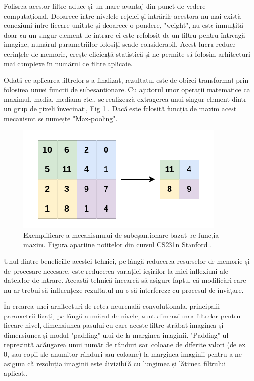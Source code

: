 \documentclass[a4paper,12pt]{book}
\begin{document}
				Folisrea acestor filtre aduce și un mare avantaj din punct de vedere computațional. Deoarece între nivelele rețelei și intrările acestora nu mai există conexiuni între fiecare unitate și deoarece o pondere, "weight", nu este înmulțită doar cu un singur element de intrare ci este refolosit de un filtru pentru întreagă imagine, numărul parametriilor folosiți scade considerabil. Acest lucru reduce cerințele de memorie, crește eficiență statistică și ne permite să folosim arhitecturi mai complexe în numărul de filtre aplicate. \par
				
				Odată ce aplicarea filtrelor s-a finalizat, rezultatul este de obicei transformat prin folosirea unuei funcții de subeșantionare. Cu ajutorul unor operații matematice ca maximul, media, mediana etc., se realizează extragerea unui singur element dintr-un grup de pixeli învecinați, Fig \ref{fig:maxpool} . Dacă este folosită funcția de maxim acest mecanismt se numește "Max-pooling".
				
				\begin{figure}[h]
					\centering
					\includegraphics[scale=0.25]{maxpool}
					\caption{Exemplificare a mecanismului de subeșantionare bazat pe funcția maxim. Figura aparține notitelor din cursul CS231n Stanford \cite{standord_cnn}.}
					\label{fig:maxpool}
				\end{figure}
				
				 \noindent Unul dintre beneficiile acestei tehnici, pe lângă reducerea resurselor de memorie și de procesare necesare, este reducerea variației ieșirilor la mici inflexiuni ale datelelor de intrare. Această tehnică încearcă să asigure faptul că modificări care nu ar trebui să influențeze rezultatul nu o să interfereze cu procesul de învățare. \par
				 
				 În crearea unei arhitecturi de rețea neuronală convolutionala, principalii parametrii fixați, pe lângă numărul de nivele, sunt dimensiunea filtrelor pentru fiecare nivel, dimensiunea pasului cu care aceste filtre străbat imaginea și dimensiunea și modul "padding"-ului de la marginea imaginii. "Padding"-ul reprezintă adăugarea unui număr de rânduri sau coloane de diferite valori (de ex 0, sau copii ale anumitor rânduri sau coloane) la marginea imaginii pentru a ne asigura că rezoluția imaginii este divizibilă cu lungimea și lățimea filtrului aplicat..
				
\end{document}
